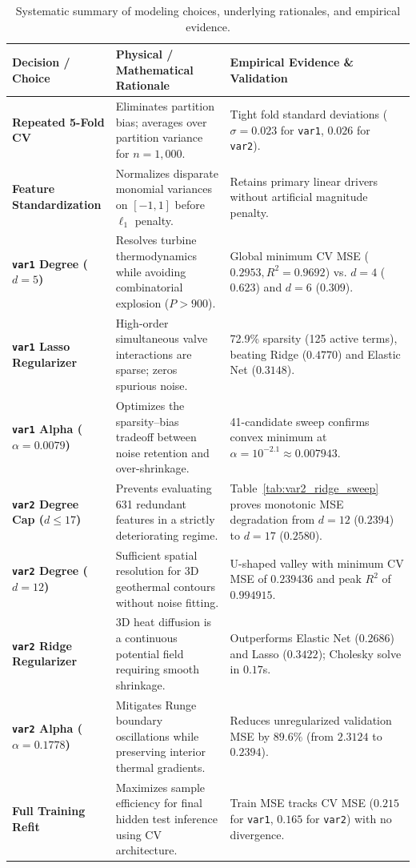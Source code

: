 \documentclass[10pt,a4paper]{article}
\begin{document}
\begin{table}[ht]
\centering
\scriptsize
\setlength{\tabcolsep}{3pt}
\begin{tabular}{p{}p{}p{}}
\toprule
\textbf{Decision / Choice} & \textbf{Physical / Mathematical Rationale} & \textbf{Empirical Evidence \& Validation} \\
\midrule
\textbf{Repeated 5-Fold CV} & Eliminates partition bias; averages over partition variance for $n=1{,}000$. & Tight fold standard deviations ($\sigma = 0.023$ for \texttt{var1}, $0.026$ for \texttt{var2}). \\
\textbf{Feature Standardization} & Normalizes disparate monomial variances on $[-1, 1]$ before $\ell_1$ penalty. & Retains primary linear drivers without artificial magnitude penalty. \\
\textbf{\texttt{var1} Degree ($d = 5$)} & Resolves turbine thermodynamics while avoiding combinatorial explosion ($P > 900$). & Global minimum CV MSE ($0.2953, R^2=0.9692$) vs. $d=4$ ($0.623$) and $d=6$ ($0.309$). \\
\textbf{\texttt{var1} Lasso Regularizer} & High-order simultaneous valve interactions are sparse; zeros spurious noise. & 72.9\% sparsity (125 active terms), beating Ridge ($0.4770$) and Elastic Net ($0.3148$). \\
\textbf{\texttt{var1} Alpha ($\alpha = 0.0079$)} & Optimizes the sparsity--bias tradeoff between noise retention and over-shrinkage. & 41-candidate sweep confirms convex minimum at $\alpha = 10^{-2.1} \approx 0.007943$. \\
\textbf{\texttt{var2} Degree Cap ($d \le 17$)} & Prevents evaluating 631 redundant features in a strictly deteriorating regime. & Table~\ref{tab:var2_ridge_sweep} proves monotonic MSE degradation from $d=12$ ($0.2394$) to $d=17$ ($0.2580$). \\
\textbf{\texttt{var2} Degree ($d = 12$)} & Sufficient spatial resolution for 3D geothermal contours without noise fitting. & U-shaped valley with minimum CV MSE of $0.239436$ and peak $R^2$ of $0.994915$. \\
\textbf{\texttt{var2} Ridge Regularizer} & 3D heat diffusion is a continuous potential field requiring smooth shrinkage. & Outperforms Elastic Net ($0.2686$) and Lasso ($0.3422$); Cholesky solve in $0.17$s. \\
\textbf{\texttt{var2} Alpha ($\alpha = 0.1778$)} & Mitigates Runge boundary oscillations while preserving interior thermal gradients. & Reduces unregularized validation MSE by $89.6\%$ (from $2.3124$ to $0.2394$). \\
\textbf{Full Training Refit} & Maximizes sample efficiency for final hidden test inference using CV architecture. & Train MSE tracks CV MSE ($0.215$ for \texttt{var1}, $0.165$ for \texttt{var2}) with no divergence. \\
\bottomrule
\end{tabular}
\caption{Systematic summary of modeling choices, underlying rationales, and empirical evidence.}
\label{tab:rationales_and_evidence}
\end{table}
\end{document}

